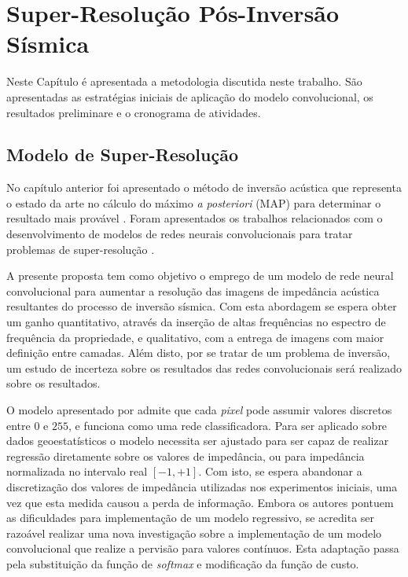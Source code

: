 \chapter{Super-Resolução Pós-Inversão Sísmica}
\label{cap:3modeloHibrido}

Neste Capítulo é apresentada a metodologia discutida neste trabalho.
São apresentadas as estratégias iniciais de aplicação do modelo convolucional,
os resultados preliminare e o cronograma de atividades.

\section{Modelo de Super-Resolução}

No capítulo anterior foi apresentado o método de inversão acústica que
representa o estado da arte no cálculo do máximo \textit{a posteriori} (MAP) para determinar o
resultado mais provável \citep{Buland01012003, leandroGRSL}. Foram apresentados os trabalhos relacionados
com o desenvolvimento de modelos de redes neurais convolucionais para tratar problemas de
super-resolução \citep{Oord16,He2016,DahlNS17}. 
 
A presente proposta tem como objetivo o emprego de um modelo de rede neural convolucional
para aumentar a resolução das imagens de impedância acústica
resultantes do processo de inversão sísmica. Com esta abordagem se espera obter um ganho
quantitativo, através da inserção de altas frequências no espectro de frequência da
propriedade, e qualitativo, com a entrega de imagens com maior definição entre camadas.
Além disto, por se tratar de um problema de inversão, um estudo de incerteza sobre os
resultados das redes convolucionais será realizado sobre os resultados.

O modelo apresentado por \cite{DahlNS17} admite que cada \textit{pixel} pode assumir valores discretos entre
$0$ e $255$, e funciona como uma rede classificadora. Para ser aplicado sobre dados geoestatísticos o modelo
necessita ser ajustado para ser capaz de realizar regressão
diretamente sobre os valores de impedância, ou para impedância normalizada no intervalo real
$[-1,+1]$. Com isto, se espera abandonar a discretização dos valores de impedância utilizadas
nos experimentos iniciais, uma vez que esta medida causou a perda de informação. 
Embora os autores pontuem as dificuldades para implementação de um modelo regressivo,
se acredita ser razoável realizar uma nova investigação sobre a implementação de um
modelo convolucional que realize a pervisão para valores contínuos. Esta adaptação
passa pela substituição da função de \textit{softmax} e modificação da função de custo.

